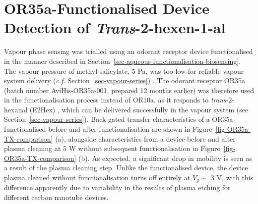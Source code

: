 \documentclass[
  a4paper,
]{scrbook}
\begin{document}
\hypertarget{or35a-functionalised-device-detection-of-trans-2-hexen-1-al}{%
\section{\texorpdfstring{OR35a-Functionalised Device Detection of
\emph{Trans}-2-hexen-1-al}{OR35a-Functionalised Device Detection of Trans-2-hexen-1-al}}\label{or35a-functionalised-device-detection-of-trans-2-hexen-1-al}}

Vapour phase sensing was trialled using an odorant receptor device
functionalised in the manner described in
Section~\ref{sec-aqueous-functionalisation-biosensing}. The vapour
pressure of methyl salicylate, 5 Pa, was too low for reliable vapour
system delivery (\emph{c.f.} Section~\ref{sec-vapour-series})
\autocite{MeSal}. The odorant receptor OR35a (batch number
AviHis-OR35a-001, prepared 12 months earlier) was therefore used in the
functionalisation process instead of OR10a, as it responds to
\emph{trans}-2-hexanal (E2Hex) \autocite{Murugathas2019a}, which can be
delivered successfully in the vapour system (see
Section~\ref{sec-vapour-series}). Back-gated transfer characteristics of
a OR35a-functionalised before and after functionalisation are shown in
Figure~\ref{fig-OR35a-TX-comparison} (a), alongside characteristics from
a device before and after plasma cleaning at 5 W without subsequent
functionalisation in Figure~\ref{fig-OR35a-TX-comparison} (b). As
expected, a significant drop in mobility is seen as a result of the
plasma cleaning step. Unlike the functionalised device, the device
plasma cleaned without functionalisation turns off entirely at
\(V_g \sim\) 3 V, with this difference apparently due to variability in
the results of plasma etching for different carbon nanotube devices.
\end{document}

